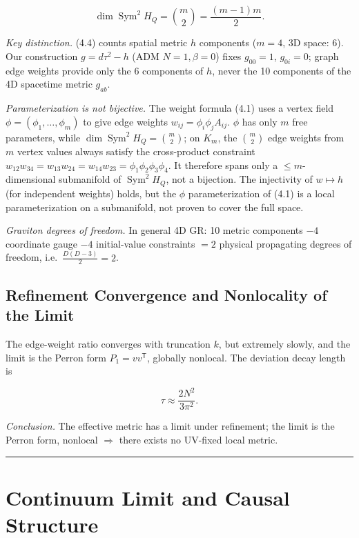 \documentclass[
  11pt,
]{article}
\begin{document}
\[
\dim\operatorname{Sym}^2H_Q=\binom m2=\frac{(m-1)m}{2}.
\tag{4.4}
\]

\emph{Key distinction.} (4.4) counts spatial metric \(h\) components
(\(m=4\), 3D space: 6). Our construction \(g=d\tau^2-h\) (ADM
\(N=1,\beta=0\)) fixes \(g_{00}=1\), \(g_{0i}=0\); graph edge weights
provide only the 6 components of \(h\), never the 10 components of the
4D spacetime metric \(g_{ab}\).

\emph{Parameterization is not bijective.} The weight formula (4.1) uses
a vertex field \(\phi=(\phi_1,\dots,\phi_m)\) to give edge weights
\(w_{ij}=\phi_i\phi_jA_{ij}\). \(\phi\) has only \(m\) free parameters,
while \(\dim\operatorname{Sym}^2H_Q=\binom m2\); on \(K_m\), the
\(\binom m2\) edge weights from \(m\) vertex values always satisfy the
cross-product constraint
\(w_{12}w_{34}=w_{13}w_{24}=w_{14}w_{23}=\phi_1\phi_2\phi_3\phi_4\). It
therefore spans only a \(\le m\)-dimensional submanifold of
\(\operatorname{Sym}^2H_Q\), not a bijection. The injectivity of
\(w\mapsto h\) (for independent weights) holds, but the \(\phi\)
parameterization of (4.1) is a local parameterization on a submanifold,
not proven to cover the full space.

\emph{Graviton degrees of freedom.} In general 4D GR: 10 metric
components \(-4\) coordinate gauge \(-4\) initial-value constraints
\(=2\) physical propagating degrees of freedom,
i.e.~\(\frac{D(D-3)}2=2\).

\subsection{Refinement Convergence and Nonlocality of the
Limit}\label{refinement-convergence-and-nonlocality-of-the-limit}

The edge-weight ratio converges with truncation \(k\), but extremely
slowly, and the limit is the Perron form \(P_1=vv^{\mathsf T}\),
globally nonlocal. The deviation decay length is

\[
\tau\approx\frac{2N^2}{3\pi^2}.
\tag{4.5}
\]

\emph{Conclusion.} The effective metric has a limit under refinement;
the limit is the Perron form, nonlocal \(\Rightarrow\) there exists no
UV-fixed local metric.

\begin{center}\rule{0.5\linewidth}{0.5pt}\end{center}

\section{Continuum Limit and Causal
Structure}\label{continuum-limit-and-causal-structure}
\end{document}
